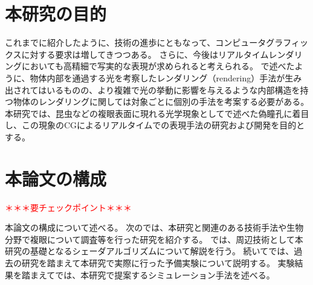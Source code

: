
\section{本研究の目的}
\label{SObjective}

これまでに紹介したように、技術の進歩にともなって、コンピュータグラフィックスに対する要求は増してきつつある。
さらに、今後はリアルタイムレンダリングにおいても高精細で写実的な表現が求められると考えられる。
で述べたように、物体内部を通過する光を考察したレンダリング（rendering）手法が生み出されてはいるものの、より複雑で光の挙動に影響を与えるような内部構造を持つ物体のレンダリングに関しては対象ごとに個別の手法を考案する必要がある。
本研究では、昆虫などの複眼表面に現れる光学現象としてで述べた偽瞳孔に着目し、この現象のCGによるリアルタイムでの表現手法の研究および開発を目的とする。

\section{本論文の構成}
\label{SPaper_structure}

\textcolor{red}{＊＊＊要チェックポイント＊＊＊}

本論文の構成について述べる。
次のでは、本研究と関連のある技術手法や生物分野で複眼について調査等を行った研究を紹介する。
では、周辺技術として本研究の基礎となるシェーダアルゴリズムについて解説を行う。
続いてでは、過去の研究を踏まえて本研究で実際に行った予備実験について説明する。
実験結果を踏まえてでは、本研究で提案するシミュレーション手法を述べる。
